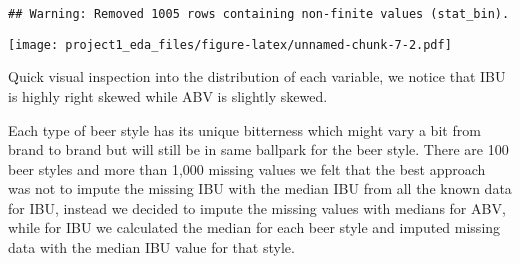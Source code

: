 \documentclass[]{article}
\begin{document}
\begin{verbatim}
## Warning: Removed 1005 rows containing non-finite values (stat_bin).
\end{verbatim}

\texttt{[image: project1\_eda\_files/figure-latex/unnamed-chunk-7-2.pdf]}

Quick visual inspection into the distribution of each variable, we
notice that IBU is highly right skewed while ABV is slightly skewed.

Each type of beer style has its unique bitterness which might vary a bit
from brand to brand but will still be in same ballpark for the beer
style. There are 100 beer styles and more than 1,000 missing values we
felt that the best approach was not to impute the missing IBU with the
median IBU from all the known data for IBU, instead we decided to impute
the missing values with medians for ABV, while for IBU we calculated the
median for each beer style and imputed missing data with the median IBU
value for that style.
\end{document}

